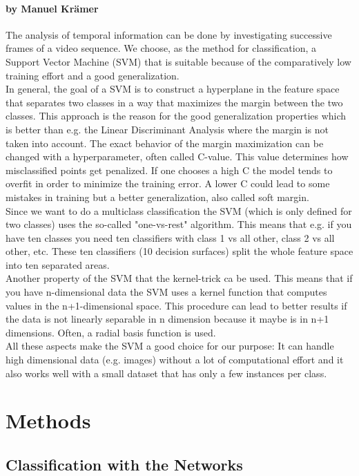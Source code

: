 \documentclass[11pt]{report}
\begin{document}
\subsubsection{by Manuel Krämer}
The analysis of temporal information can be done by investigating successive frames of a video sequence. We choose, as the method for classification, a Support Vector Machine (SVM) that is suitable because of the comparatively low training effort and a good generalization. \\
In general, the goal of a SVM is to construct a hyperplane in the feature space that separates two classes in a way that maximizes the margin between the two classes. This approach is the reason for the good generalization properties which is better than e.g. the Linear Discriminant Analysis where the margin is not taken into account. The exact behavior of the margin maximization can be changed with a hyperparameter, often called C-value. This value determines how misclassified points get penalized. If one chooses a high C the model tends to overfit in order to minimize the training error. A lower C could lead to some mistakes in training but a better generalization, also called soft margin. \\
Since we want to do a multiclass classification the SVM (which is only defined for two classes) uses the so-called "one-vs-rest" algorithm. This means that e.g. if you have ten classes you need ten classifiers with class 1 vs all other, class 2 vs all other, etc. These ten classifiers (10 decision surfaces) split the whole feature space into ten separated areas.\\
Another property of the SVM that the kernel-trick ca be used. This means that if you have n-dimensional data the SVM uses a kernel function that computes values in the n+1-dimensional space. This procedure can lead to better results if the data is not linearly separable in n dimension because it maybe is in n+1 dimensions. Often, a radial basis function is used.\\ 
All these aspects make the SVM a good choice for our purpose: It can handle high dimensional data (e.g. images) without a lot of computational effort and it also works well with a small dataset that has only a few instances per class.

\chapter{Methods}
\section{Classification with the Networks}
\end{document}

